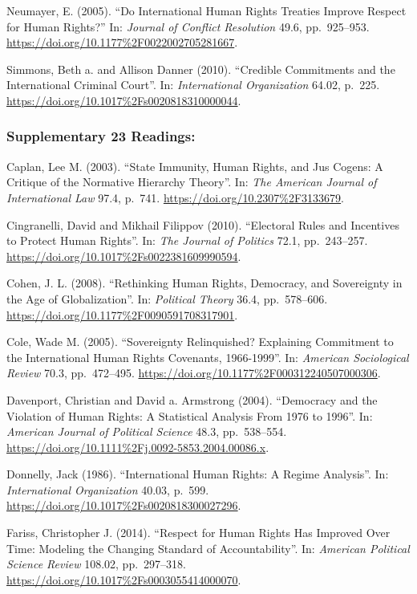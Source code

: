 \documentclass[10pt,]{article}
\begin{document}
Neumayer, E. (2005). ``Do International Human Rights Treaties Improve
Respect for Human Rights?'' In: \emph{Journal of Conflict Resolution}
49.6, pp.~925--953. \url{https://doi.org/10.1177\%2F0022002705281667}.

Simmons, Beth a. and Allison Danner (2010). ``Credible Commitments and
the International Criminal Court''. In:
\emph{International Organization} 64.02, p.~225.
\url{https://doi.org/10.1017\%2Fs0020818310000044}.

\subsubsection{Supplementary \textbar{} 23
Readings:}\label{supplementary-23-readings}

Caplan, Lee M. (2003). ``State Immunity, Human Rights, and Jus Cogens: A
Critique of the Normative Hierarchy Theory''. In:
\emph{The American Journal of International Law} 97.4, p.~741.
\url{https://doi.org/10.2307\%2F3133679}.

Cingranelli, David and Mikhail Filippov (2010). ``Electoral Rules and
Incentives to Protect Human Rights''. In: \emph{The Journal of Politics}
72.1, pp.~243--257. \url{https://doi.org/10.1017\%2Fs0022381609990594}.

Cohen, J. L. (2008). ``Rethinking Human Rights, Democracy, and
Sovereignty in the Age of Globalization''. In: \emph{Political Theory}
36.4, pp.~578--606. \url{https://doi.org/10.1177\%2F0090591708317901}.

Cole, Wade M. (2005). ``Sovereignty Relinquished? Explaining Commitment
to the International Human Rights Covenants, 1966-1999''. In:
\emph{American Sociological Review} 70.3, pp.~472--495.
\url{https://doi.org/10.1177\%2F000312240507000306}.

Davenport, Christian and David a. Armstrong (2004). ``Democracy and the
Violation of Human Rights: A Statistical Analysis From 1976 to 1996''.
In: \emph{American Journal of Political Science} 48.3, pp.~538--554.
\url{https://doi.org/10.1111\%2Fj.0092-5853.2004.00086.x}.

Donnelly, Jack (1986). ``International Human Rights: A Regime
Analysis''. In: \emph{International Organization} 40.03, p.~599.
\url{https://doi.org/10.1017\%2Fs0020818300027296}.

Fariss, Christopher J. (2014). ``Respect for Human Rights Has Improved
Over Time: Modeling the Changing Standard of Accountability''. In:
\emph{American Political Science Review} 108.02, pp.~297--318.
\url{https://doi.org/10.1017\%2Fs0003055414000070}.
\end{document}
